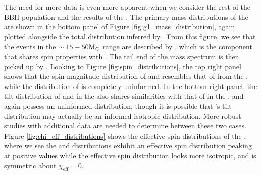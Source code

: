 The need for more data is even more apparent when we consider the rest of the BBH population and the results of the \comp{}. The primary mass distributions of the \comp{} are shown in the bottom panel of Figure \ref{fig:g1_mass_distribution}, again plotted alongside the total distribution inferred by \brucepaper{}. From this figure, we see that the events in the $\sim15-50 {\rm M}_\odot$ range are described by \contA{}, which is the component that shares spin properties with \first{}. The tail end of the mass spectrum is then picked up by \contB{}. Looking to Figure \ref{fig:spin_distributions}, the top right panel shows that the spin magnitude distribution of \first{} and \contA{} resembles that of \first{} from the \base{}, while the distribution of \contB{} is completely uninformed. In the bottom right panel, the tilt distribution of \first{} and \contA{} in the \comp{} also shares similarities with that of \first{} in the \base{}, and again \contB{} possess an uninformed distribution, though it is possible that \contB{}'s tilt distribution may actually be an informed isotropic distribution. More robust studies with additional data are needed to determine between these two cases. Figure \ref{fig:chi_eff_distributions} shows the effective spin distributions of the \comp{}, where we see the \first{} and \contA{} distributions exhibit an effective spin distribution peaking at positive values while the \contB{} effective spin distribution looks more isotropic, and is symmetric about $\chi_\mathrm{eff} = 0$.


